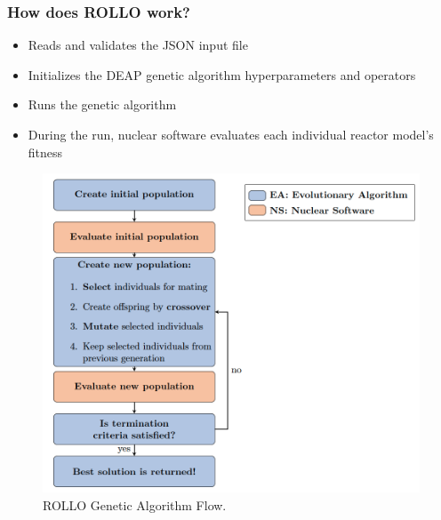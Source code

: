 \begin{frame}
    \frametitle{How does ROLLO work?}
    \begin{minipage}[c]{0.45\textwidth}
        \begin{itemize}
            \item Reads and validates the JSON input file
            \item Initializes the \acrfull{DEAP} genetic algorithm hyperparameters and 
            operators 
            \item Runs the genetic algorithm  
            \item During the run, nuclear software evaluates each individual reactor 
            model's fitness
        \end{itemize}
    \end{minipage}\hfill
    \begin{minipage}[c]{0.52\textwidth}
        \centering
        \begin{figure}
            \includegraphics[width=\linewidth]{figures/rollo-flow.png} 
            \caption{ROLLO Genetic Algorithm Flow.}
        \end{figure}
    \end{minipage}
\end{frame}

